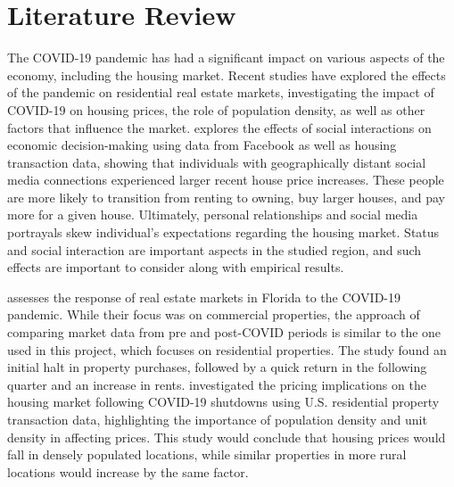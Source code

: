 \documentclass[12pt,english]{article}
\begin{document}
\section{Literature Review}\label{sec:litreview}
The COVID-19 pandemic has had a significant impact on various aspects of the economy, including the housing market. Recent studies have explored the effects of the pandemic on residential real estate markets, investigating the impact of COVID-19 on housing prices, the role of population density, as well as other factors that influence the market. \cite{Bailey2018} explores the effects of social interactions on economic decision-making using data from Facebook as well as housing transaction data, showing that individuals with geographically distant social media connections experienced larger recent house price increases. These people are more likely to transition from renting to owning, buy larger houses, and pay more for a given house. Ultimately, personal relationships and social media portrayals skew individual’s expectations regarding the housing market. Status and social interaction are important aspects in the studied region, and such effects are important to consider along with empirical results. 

\cite{Wen2022} assesses the response of real estate markets in Florida to the COVID-19 pandemic. While their focus was on commercial properties, the approach of comparing market data from pre and post-COVID periods is similar to the one used in this project, which focuses on residential properties. The study found an initial halt in property purchases, followed by a quick return in the following quarter and an increase in rents. \cite{DLima2022} investigated the pricing implications on the housing market following COVID-19 shutdowns using U.S. residential property transaction data, highlighting the importance of population density and unit density in affecting prices. This study would conclude that housing prices would fall in densely populated locations, while similar properties in more rural locations would increase by the same factor. 
\end{document}
